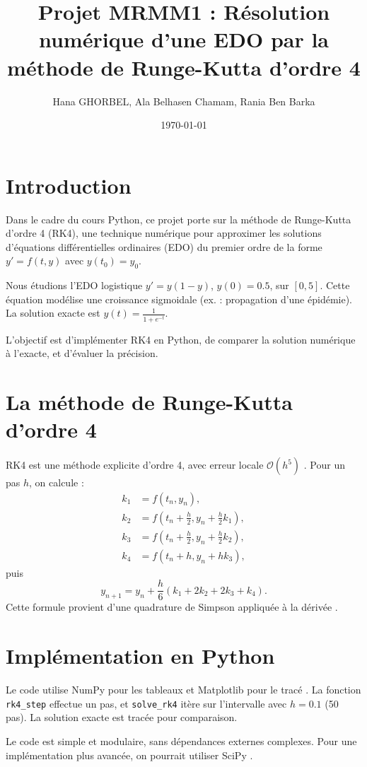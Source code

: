 \documentclass[12pt,a4paper]{article}
\title{Projet MRMM1 : Résolution numérique d'une EDO par la méthode de Runge-Kutta d'ordre 4}
\author{Hana GHORBEL, Ala Belhasen Chamam, Rania Ben Barka}
\date{\today}
\begin{document}
\maketitle

\section{Introduction}
Dans le cadre du cours Python, ce projet porte sur la méthode de Runge-Kutta d'ordre 4 (RK4), une technique numérique pour approximer les solutions d'équations différentielles ordinaires (EDO) du premier ordre de la forme $y' = f(t, y)$ avec $y(t_0) = y_0$.

Nous étudions l'EDO logistique $y' = y(1 - y)$, $y(0) = 0.5$, sur $[0, 5]$. Cette équation modélise une croissance sigmoidale (ex. : propagation d'une épidémie). La solution exacte est $y(t) = \frac{1}{1 + e^{-t}}$.

L'objectif est d'implémenter RK4 en Python, de comparer la solution numérique à l'exacte, et d'évaluer la précision.

\section{La méthode de Runge-Kutta d'ordre 4}
RK4 est une méthode explicite d'ordre 4, avec erreur locale $\mathcal{O}(h^5)$ \cite{butcher}. Pour un pas $h$, on calcule :
\begin{align*}
k_1 &= f(t_n, y_n), \\
k_2 &= f\left(t_n + \frac{h}{2}, y_n + \frac{h}{2} k_1\right), \\
k_3 &= f\left(t_n + \frac{h}{2}, y_n + \frac{h}{2} k_2\right), \\
k_4 &= f(t_n + h, y_n + h k_3),
\end{align*}
puis
\[
y_{n+1} = y_n + \frac{h}{6} (k_1 + 2k_2 + 2k_3 + k_4).
\]
Cette formule provient d'une quadrature de Simpson appliquée à la dérivée \cite{hairer}.

\section{Implémentation en Python}
Le code utilise NumPy pour les tableaux et Matplotlib pour le tracé \cite{numpy,matplotlib}. La fonction \texttt{rk4\_step} effectue un pas, et \texttt{solve\_rk4} itère sur l'intervalle avec $h = 0.1$ (50 pas). La solution exacte est tracée pour comparaison.

Le code est simple et modulaire, sans dépendances externes complexes. Pour une implémentation plus avancée, on pourrait utiliser SciPy \cite{scipy}.
\end{document}
